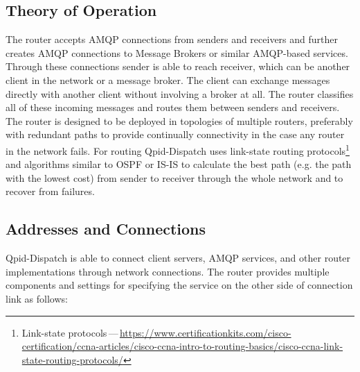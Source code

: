 \subsection{Theory of Operation}
The router accepts AMQP connections from senders and receivers and further creates AMQP connections to Message Brokers or similar AMQP-based services. Through these connections sender is able to reach receiver, which can be another client in the network or a message broker. The client can exchange messages directly with another client without involving a broker at all. The router classifies all of these incoming messages and routes them between senders and receivers. The router is designed to be deployed in topologies of multiple routers, preferably with redundant paths to provide continually connectivity in the case any router in the network fails. For routing Qpid-Dispatch uses link-state routing protocols\footnote{Link-state protocols\,---\,\url{https://www.certificationkits.com/cisco-certification/ccna-articles/cisco-ccna-intro-to-routing-basics/cisco-ccna-link-state-routing-protocols/}} and algorithms similar to OSPF or IS-IS to calculate the best path (e.g. the path with the lowest cost) from sender to receiver through the whole network and to recover from failures.

\subsection{Addresses and Connections}
\label{Addresses and Connections}
Qpid-Dispatch is able to connect client servers, AMQP services, and other router implementations through network connections. The router provides multiple components and settings for specifying the service on the other side of connection link as follows:

